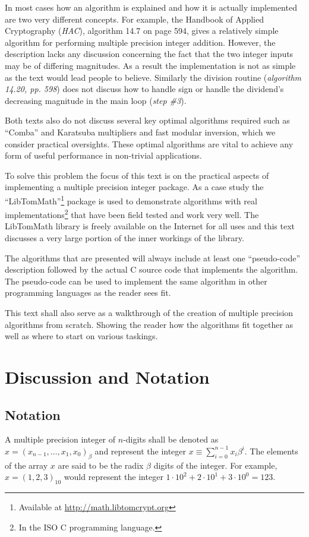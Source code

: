 \documentclass[b5paper]{book}
\begin{document}
In most cases how an algorithm is explained and how it is actually implemented are two very different concepts.  For 
example, the Handbook of Applied Cryptography (\textit{HAC}), algorithm 14.7 on page 594, gives a relatively simple 
algorithm for performing multiple precision integer addition.  However, the description lacks any discussion concerning 
the fact that the two integer inputs may be of differing magnitudes.  As a result the implementation is not as simple
as the text would lead people to believe.  Similarly the division routine (\textit{algorithm 14.20, pp. 598}) does not 
discuss how to handle sign or handle the dividend's decreasing magnitude in the main loop (\textit{step \#3}).

Both texts also do not discuss several key optimal algorithms required such as ``Comba'' and Karatsuba multipliers 
and fast modular inversion, which we consider practical oversights.  These optimal algorithms are vital to achieve 
any form of useful performance in non-trivial applications.  

To solve this problem the focus of this text is on the practical aspects of implementing a multiple precision integer
package.  As a case study the ``LibTomMath''\footnote{Available at \url{http://math.libtomcrypt.org}} package is used 
to demonstrate algorithms with real implementations\footnote{In the ISO C programming language.} that have been field 
tested and work very well.  The LibTomMath library is freely available on the Internet for all uses and this text 
discusses a very large portion of the inner workings of the library.

The algorithms that are presented will always include at least one ``pseudo-code'' description followed 
by the actual C source code that implements the algorithm.  The pseudo-code can be used to implement the same 
algorithm in other programming languages as the reader sees fit.  

This text shall also serve as a walkthrough of the creation of multiple precision algorithms from scratch.  Showing
the reader how the algorithms fit together as well as where to start on various taskings.  

\section{Discussion and Notation}
\subsection{Notation}
A multiple precision integer of $n$-digits shall be denoted as $x = (x_{n-1}, \ldots, x_1, x_0)_{ \beta }$ and represent
the integer $x \equiv \sum_{i=0}^{n-1} x_i\beta^i$.  The elements of the array $x$ are said to be the radix $\beta$ digits 
of the integer.  For example, $x = (1,2,3)_{10}$ would represent the integer 
$1\cdot 10^2 + 2\cdot10^1 + 3\cdot10^0 = 123$.  
\end{document}
